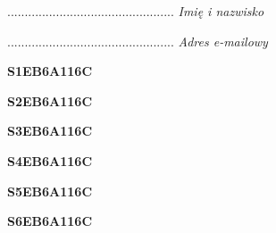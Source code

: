 \begin{turn}{90}\begin{minipage}{\linewidth} \vspace{20mm} ................................................  \textit{Imię i nazwisko}\end{minipage}\end{turn}

\begin{turn}{90}\begin{minipage}{\linewidth} \vspace{20mm} ................................................  \textit{Adres e-mailowy}\end{minipage}\end{turn}

\begin{turn}{90}\huge \begin{minipage}{\linewidth} \vspace{10mm}\textbf{S1EB6A116C}\end{minipage}\end{turn}

\begin{turn}{90}\huge \begin{minipage}{\linewidth} \vspace{10mm}\textbf{S2EB6A116C}\end{minipage}\end{turn}

\begin{turn}{90}\huge \begin{minipage}{\linewidth} \vspace{10mm}\textbf{S3EB6A116C}\end{minipage}\end{turn}

\begin{turn}{90}\huge \begin{minipage}{\linewidth} \vspace{10mm}\textbf{S4EB6A116C}\end{minipage}\end{turn}

\begin{turn}{90}\huge \begin{minipage}{\linewidth} \vspace{10mm}\textbf{S5EB6A116C}\end{minipage}\end{turn}

\begin{turn}{90}\huge \begin{minipage}{\linewidth} \vspace{10mm}\textbf{S6EB6A116C}\end{minipage}\end{turn}

